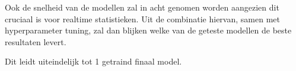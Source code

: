 Ook de snelheid van de modellen zal in acht genomen worden aangezien dit cruciaal is voor realtime statistieken. Uit de combinatie hiervan, samen met hyperparameter tuning, zal dan blijken welke van de geteste modellen de beste \\resultaten levert.

Dit leidt uiteindelijk tot 1 getraind finaal model.






